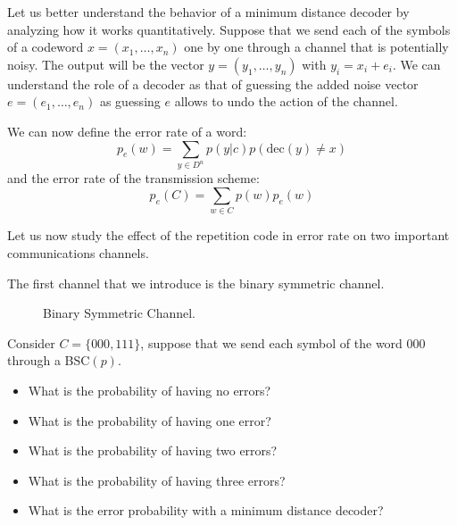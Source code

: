 Let us better understand the behavior of a minimum distance decoder by analyzing how it works quantitatively. Suppose that we send each of the symbols of a codeword $x=(x_1,\ldots,x_n)$ one by one through a channel that is potentially noisy. The output will be the vector $y=(y_1,\ldots,y_n)$ with $y_i=x_i+e_i$. We can understand the role of a decoder as that of guessing the added noise vector $e=(e_1,\ldots,e_n)$ as guessing $e$ allows to undo the action of the channel.

We can now define the error rate of a word:
\begin{equation}
p_e(w)=\sum_{y\in D^n}p(y|c)p(\text{dec}(y)\neq x)
\end{equation}
and the error rate of the transmission scheme:
\begin{equation}
p_e(C)=\sum_{w\in C}p(w)p_e(w)
\end{equation}

Let us now study the effect of the repetition code in error rate on two important communications channels.

The first channel that we introduce is the binary symmetric channel. 
\begin{figure}[h]
\begin{center}
\def\svgwidth{\columnwidth} 
 
\caption{Binary Symmetric Channel.}
\label{fig:bsc}
\end{center}
\end{figure}

\begin{exercise}
Consider $C=\{000,111\}$, suppose that we send each symbol of the word 000 through a BSC$(p)$.
\begin{itemize}
\item What is the probability of having no errors?
\item What is the probability of having one error?
\item What is the probability of having two errors?
\item What is the probability of having three errors?
\item What is the error probability with a minimum distance decoder?
\end{itemize}
\end{exercise}

